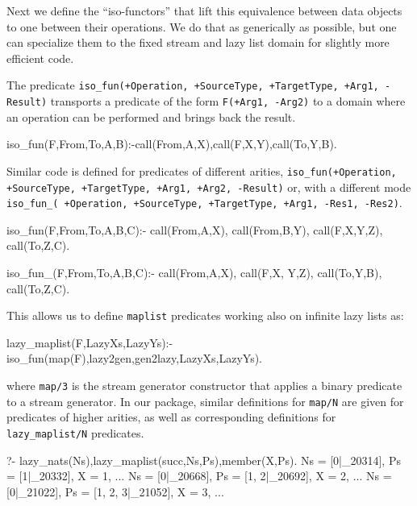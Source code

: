 \documentclass{new_tlp}
\begin{document}
Next we define the ``iso-functors'' that 
lift this equivalence between data objects to 
one between their operations. We do that as generically as possible,
but one can specialize them to the fixed stream and lazy list domain
for slightly more efficient code.

The predicate 
{\tt iso\_fun(+Operation, +SourceType, +TargetType, +Arg1, -Result)}
transports a predicate of the form {\tt F(+Arg1, -Arg2)} to a domain where
an operation can be performed and brings back the result.

\begin{code}
iso_fun(F,From,To,A,B):-call(From,A,X),call(F,X,Y),call(To,Y,B).
\end{code}
Similar code is defined for predicates of different arities,
{\tt iso\_fun(+Operation, +SourceType, +TargetType, +Arg1, +Arg2, -Result)} 
or, with a different mode
{\tt iso\_fun\_( +Operation, +SourceType, +TargetType, +Arg1, -Res1, -Res2)}.

\begin{codeh}
%
iso_fun(F,From,To,A,B,C):-
  call(From,A,X),
  call(From,B,Y),
  call(F,X,Y,Z),
  call(To,Z,C).

%
iso_fun_(F,From,To,A,B,C):- 
  call(From,A,X),
  call(F,X, Y,Z), %
  call(To,Y,B),
  call(To,Z,C).
\end{codeh}


This allows us to define {\tt maplist} predicates working also
on infinite lazy lists as:

\begin{code}
lazy_maplist(F,LazyXs,LazyYs):-iso_fun(map(F),lazy2gen,gen2lazy,LazyXs,LazyYs).
\end{code}
where {\tt map/3} is the stream generator constructor that applies a binary
predicate to a stream generator. In our package, similar definitions for {\tt map/N}
are given for predicates of higher arities, as well as corresponding definitions for
{\tt lazy\_maplist/N} predicates.

\BX
\begin{codex}
?- lazy_nats(Ns),lazy_maplist(succ,Ns,Ps),member(X,Ps).
Ns = [0|_20314], Ps = [1|_20332], X = 1,
...
Ns = [0|_20668], Ps = [1, 2|_20692], X = 2,
...
Ns = [0|_21022], Ps = [1, 2, 3|_21052], X = 3,
...
\end{codex}
\EX
\end{document}

